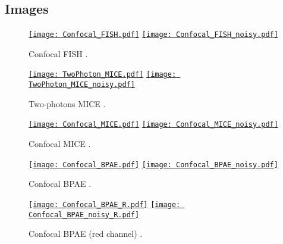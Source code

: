 \documentclass{report}%
\begin{document}
\begin{appendix}

\chapter{Images}
\label{sec:images}  
  
\begin{figure}[h]
  \centering
  \href{https://nbviewer.org/github/vicente-gonzalez-ruiz/denoising/blob/main/notebooks/Confocal_FISH.ipynb}{\texttt{[image: Confocal\_FISH.pdf]}}
  \href{https://nbviewer.org/github/vicente-gonzalez-ruiz/denoising/blob/main/notebooks/Confocal_FISH_noisy.ipynb}{\texttt{[image: Confocal\_FISH\_noisy.pdf]}}
  \caption{Confocal FISH \cite{zhang2019poisson}.\label{fig:Confocal_FISH}}
\end{figure}

\begin{figure}[h]
  \centering
  \href{https://nbviewer.org/github/vicente-gonzalez-ruiz/denoising/blob/main/notebooks/TwoPhoton_MICE.ipynb}{\texttt{[image: TwoPhoton\_MICE.pdf]}}
  \href{https://nbviewer.org/github/vicente-gonzalez-ruiz/denoising/blob/main/notebooks/TwoPhoton_MICE_noisy.ipynb}{\texttt{[image: TwoPhoton\_MICE\_noisy.pdf]}}
  \caption{Two-photons MICE \cite{zhang2019poisson}.\label{fig:TwoPhoton_MICE}}
\end{figure}

\begin{figure}[h]
  \centering
  \href{https://nbviewer.org/github/vicente-gonzalez-ruiz/denoising/blob/main/notebooks/Confocal_MICE.ipynb}{\texttt{[image: Confocal\_MICE.pdf]}}
  \href{https://nbviewer.org/github/vicente-gonzalez-ruiz/denoising/blob/main/notebooks/Confocal_MICE_noisy.ipynb}{\texttt{[image: Confocal\_MICE\_noisy.pdf]}}
  \caption{Confocal MICE \cite{zhang2019poisson}.\label{fig:Confocal_MICE}}
\end{figure}

\begin{figure}[h]
  \centering
  \href{https://nbviewer.org/github/vicente-gonzalez-ruiz/denoising/blob/main/notebooks/Confocal_BPAE.ipynb}{\texttt{[image: Confocal\_BPAE.pdf]}}
  \href{https://nbviewer.org/github/vicente-gonzalez-ruiz/denoising/blob/main/notebooks/Confocal_BPAE.ipynb}{\texttt{[image: Confocal\_BPAE\_noisy.pdf]}}
  \caption{Confocal BPAE \cite{zhang2019poisson}.\label{fig:Confocal_BPAE}}
\end{figure}

\begin{figure}[h]
  \centering
  \href{https://nbviewer.org/github/vicente-gonzalez-ruiz/denoising/blob/main/notebooks/Confocal_BPAE.ipynb}{\texttt{[image: Confocal\_BPAE\_R.pdf]}}
  \href{https://nbviewer.org/github/vicente-gonzalez-ruiz/denoising/blob/main/notebooks/Confocal_BPAE.ipynb}{\texttt{[image: Confocal\_BPAE\_noisy\_R.pdf]}}
  \caption{Confocal BPAE (red channel) \cite{zhang2019poisson}.\label{fig:Confocal_BPAE_R}}
\end{figure}


\end{appendix}
\end{document}
